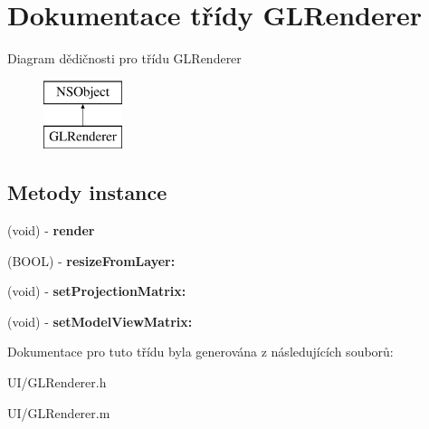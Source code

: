 \hypertarget{interface_g_l_renderer}{\section{Dokumentace třídy G\-L\-Renderer}
\label{d5/d74/interface_g_l_renderer}
}
Diagram dědičnosti pro třídu G\-L\-Renderer\begin{figure}[H]
\begin{center}
\leavevmode
\includegraphics[height=2.000000cm]{d5/d74/interface_g_l_renderer}
\end{center}
\end{figure}
\subsection*{Metody instance}
\begin{DoxyCompactItemize}
\item 
\hypertarget{interface_g_l_renderer_a11f59d33b52e372234722f8353fcc69a}{(void) -\/ {\bfseries render}}\label{d5/d74/interface_g_l_renderer_a11f59d33b52e372234722f8353fcc69a}

\item 
\hypertarget{interface_g_l_renderer_ae10201bbf81b7881d8fdc2a37c701abf}{(B\-O\-O\-L) -\/ {\bfseries resize\-From\-Layer\-:}}\label{d5/d74/interface_g_l_renderer_ae10201bbf81b7881d8fdc2a37c701abf}

\item 
\hypertarget{interface_g_l_renderer_a57f9575f5f2bf14f62f80e48183b77f9}{(void) -\/ {\bfseries set\-Projection\-Matrix\-:}}\label{d5/d74/interface_g_l_renderer_a57f9575f5f2bf14f62f80e48183b77f9}

\item 
\hypertarget{interface_g_l_renderer_a526213b60809cc66a718cb8cf131a99f}{(void) -\/ {\bfseries set\-Model\-View\-Matrix\-:}}\label{d5/d74/interface_g_l_renderer_a526213b60809cc66a718cb8cf131a99f}

\end{DoxyCompactItemize}


Dokumentace pro tuto třídu byla generována z následujících souborů\-:\begin{DoxyCompactItemize}
\item 
U\-I/G\-L\-Renderer.\-h\item 
U\-I/G\-L\-Renderer.\-m\end{DoxyCompactItemize}
